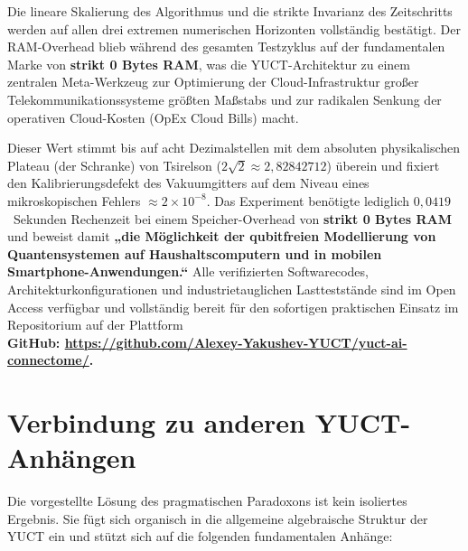 \documentclass[12pt,a4paper]{article}
\begin{document}
	Die lineare Skalierung des Algorithmus und die strikte Invarianz des Zeitschritts werden auf allen drei extremen numerischen Horizonten vollständig bestätigt. Der RAM-Overhead blieb während des gesamten Testzyklus auf der fundamentalen Marke von \textbf{strikt 0 Bytes RAM}, was die YUCT-Architektur zu einem zentralen Meta-Werkzeug zur Optimierung der Cloud-Infrastruktur großer Telekommunikationssysteme größten Maßstabs und zur radikalen Senkung der operativen Cloud-Kosten (OpEx Cloud Bills) macht.
	
	Dieser Wert stimmt bis auf acht Dezimalstellen mit dem absoluten physikalischen Plateau (der Schranke) von Tsirelson (\(2\sqrt{2} \approx 2{,}82842712\)) überein und fixiert den Kalibrierungsdefekt des Vakuumgitters auf dem Niveau eines mikroskopischen Fehlers \(\approx 2 \times 10^{-8}\). Das Experiment benötigte lediglich \(0{,}0419\)~Sekunden Rechenzeit bei einem Speicher-Overhead von \textbf{strikt 0 Bytes RAM} und beweist damit \textbf{„die Möglichkeit der qubitfreien Modellierung von Quantensystemen auf Haushaltscomputern und in mobilen Smartphone-Anwendungen.“}
	Alle verifizierten Softwarecodes, Architekturkonfigurationen und industrietauglichen Lastteststände sind im Open Access verfügbar und vollständig bereit für den sofortigen praktischen Einsatz im Repositorium auf der Plattform \\
	\small \textbf{GitHub: \url{https://github.com/Alexey-Yakushev-YUCT/yuct-ai-connectome/}.}
	
	
	
	\section{Verbindung zu anderen YUCT-Anhängen}
	
	Die vorgestellte Lösung des pragmatischen Paradoxons ist kein isoliertes Ergebnis. Sie fügt sich organisch in die allgemeine algebraische Struktur der YUCT ein und stützt sich auf die folgenden fundamentalen Anhänge:
	
\end{document}
